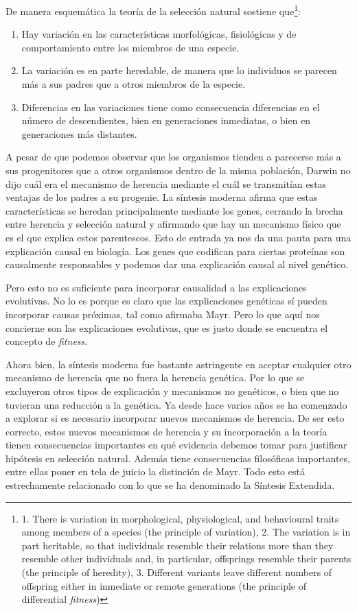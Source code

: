 De manera esquemática la teoría de la selección natural sostiene que\footnote{1. There is variation in morphological, physiological, and behavioural traits among members of a species (the principle of variation), 2. The variation is in part heritable, so that individuals resemble their relations more than they resemble other individuals and, in particular, offsprings resemble their parents (the principle of heredity), 3. Different variants leave different numbers of offspring either in inmediate or remote generations (the principle of differential \emph{fitness})}:

\begin{enumerate}
  \item Hay variación en las características morfológicas, fisiológicas y de comportamiento entre los miembros de una especie.
  \item La variación es en parte heredable, de manera que lo individuos se parecen más a sus padres que a otros miembros de la especie.
  \item Diferencias en las variaciones tiene como consecuencia diferencias en el número de descendientes, bien en generaciones inmediatas, o bien en generaciones más distantes\cite{Godfrey-Smith2013}.
\end{enumerate}

A pesar de que podemos observar que los organismos tienden a parecerse más a sus progenitores que a otros organismos dentro de la misma población, Darwin no dijo cuál era el mecanismo de herencia mediante el cuál se transmitían estas ventajas de los padres a su progenie. La síntesis moderna afirma que estas características se heredan principalmente mediante los genes, cerrando la brecha entre herencia y selección natural y afirmando que hay un mecanismo físico que es el que explica estos parentescos. Esto de entrada ya nos da una pauta para una explicación causal en biología. Los genes que codifican para ciertas proteínas son causalmente responsables y podemos dar una explicación causal al nivel genético.

Pero esto no es suficiente para incorporar causalidad a las explicaciones evolutivas. No lo es porque es claro que las explicaciones genéticas sí pueden incorporar causas próximas, tal como afirmaba Mayr. Pero lo que aquí nos concierne son las explicaciones evolutivas, que es justo donde se encuentra el concepto de \emph{fitness}.

Ahora bien, la síntesis moderna fue bastante astringente en aceptar cualquier otro mecanismo de herencia que no fuera la herencia genética. Por lo que se excluyeron otros tipos de explicación y mecanismos no genéticos, o bien que no tuvieran una reducción a la genética. Ya desde hace varios años se ha comenzado a explorar si es necesario incorporar nuevos mecanismos de herencia. De ser esto correcto, estos nuevos mecanismos de herencia y su incorporación a la teoría tienen consecuencias importantes en qué evidencia debemos tomar para justificar hipótesis en selección natural. Además tiene consecuencias filosóficas importantes, entre ellas poner en tela de juicio la distinción de Mayr. Todo esto está estrechamente relacionado con lo que se ha denominado la Síntesis Extendida.

